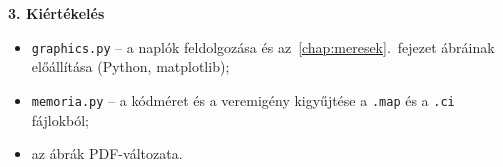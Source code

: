 \documentclass[a4paper,12pt]{report}
\theoremstyle{definition}
\theoremstyle{remark}
\begin{document}
\noindent\textbf{3. Kiértékelés}
\begin{itemize}
	\item \texttt{graphics.py} -- a naplók feldolgozása és az~\ref{chap:meresek}.~fejezet ábráinak előállítása (Python, matplotlib);
	\item \texttt{memoria.py} -- a kódméret és a veremigény kigyűjtése a \texttt{.map} és a \texttt{.ci} fájlokból;
	\item az ábrák PDF-változata.
\end{itemize}
\end{document}
